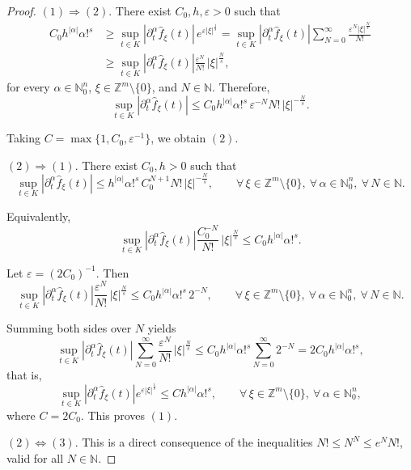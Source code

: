 \documentclass[11pt,reqno]{amsart}
\numberwithin{equation}{section}
\begin{document}
\begin{proof}
	\noindent
	\((1)\Rightarrow(2)\).
	There exist \(C_0,h,\varepsilon>0\) such that
	\begin{align*}
		C_0h^{|\alpha|}\alpha!^s
		&\geq
		\sup_{t\in K}|\partial_t^\alpha\widehat{f}_\xi(t)|\,e^{\varepsilon|\xi|^{\frac{1}{s}}}
		=
		\sup_{t\in K}|\partial_t^\alpha\widehat{f}_\xi(t)|
		\sum_{N=0}^{\infty}\frac{\varepsilon^N|\xi|^{\frac{N}{s}}}{N!}\\
		&\geq
		\sup_{t\in K}|\partial_t^\alpha\widehat{f}_\xi(t)|
		\frac{\varepsilon^{N}}{N!}\,|\xi|^{\frac{N}{s}},
	\end{align*}
	for every \(\alpha\in\mathbb{N}_0^n\), \(\xi\in\mathbb{Z}^m\setminus\{0\}\), and \(N\in\mathbb{N}\).
	Therefore,
	\[
	\sup_{t\in K}|\partial_t^\alpha\widehat{f}_\xi(t)|
	\leq
	C_0h^{|\alpha|}\alpha!^s\,\varepsilon^{-N}N!\,|\xi|^{-\frac{N}{s}}.
	\]
	
	Taking \(C=\max\{1,C_0,\varepsilon^{-1}\}\), we obtain \((2)\).
	
	\medskip
	\noindent
	\((2)\Rightarrow(1)\).
	There exist \(C_0,h>0\) such that
	\[
	\sup_{t\in K}|\partial_t^\alpha\widehat{f}_\xi(t)|
	\leq
	h^{|\alpha|}\alpha!^s\, C_0^{N+1}N!\,|\xi|^{-\frac{N}{s}},\qquad\forall\,\xi\in\mathbb{Z}^m\setminus\{0\},\ \forall\,\alpha\in\mathbb{N}_0^n,\ \forall\, N\in\mathbb{N}.
	\]
	
	Equivalently,
	\begin{equation*}
		\sup_{t\in K}|\partial_t^\alpha\widehat{f}_\xi(t)|
		\frac{C_0^{-N}}{N!}\,|\xi|^{\frac{N}{s}}
		\leq
		C_0h^{|\alpha|}\alpha!^s.
	\end{equation*}
	
	Let \(\varepsilon=(2C_0)^{-1}\). Then
	\begin{equation*}
		\sup_{t\in K}|\partial_t^\alpha\widehat{f}_\xi(t)|
		\frac{\varepsilon^{N}}{N!}\,|\xi|^{\frac{N}{s}}
		\leq
		C_0h^{|\alpha|}\alpha!^s\,2^{-N}, \qquad\forall\,\xi\in\mathbb{Z}^m\setminus\{0\},\ \forall\,\alpha\in\mathbb{N}_0^n,\ \forall\, N\in\mathbb{N}.
	\end{equation*}
	
	Summing both sides over \(N\) yields
	\begin{equation*}
		\sup_{t\in K}|\partial_t^\alpha\widehat{f}_\xi(t)|
		\sum_{N=0}^\infty \frac{\varepsilon^{N}}{N!}\,|\xi|^{\frac{N}{s}}
		\leq
		C_0h^{|\alpha|}\alpha!^s\sum_{N=0}^\infty 2^{-N}
		=2C_0h^{|\alpha|}\alpha!^s,
	\end{equation*}
	that is,
	\begin{equation*}
		\sup_{t\in K}|\partial_t^\alpha\widehat{f}_\xi(t)|
		e^{\varepsilon|\xi|^{\frac{1}{s}}}
		\leq
		Ch^{|\alpha|}\alpha!^s,\qquad\forall\,\xi\in\mathbb{Z}^m\setminus\{0\},\ \forall\,\alpha\in\mathbb{N}_0^n,
	\end{equation*}
	where \(C=2C_0\). This proves \((1)\).
	
	\medskip
	\noindent
	\((2)\Leftrightarrow(3)\).
	This is a direct consequence of the inequalities
	\(N!\leq N^N \leq e^N N!\), valid for all \(N\in\mathbb{N}\).
\end{proof}
\end{document}
